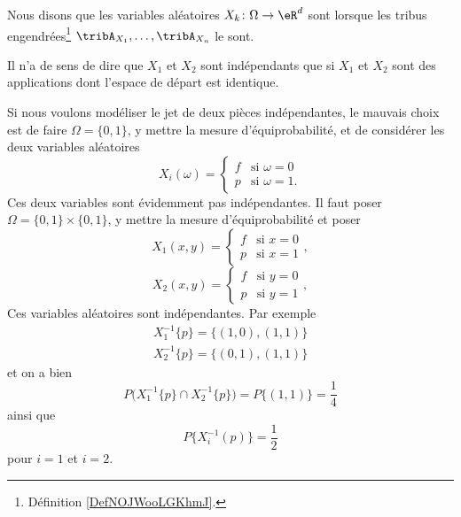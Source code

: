 \begin{definition}  \label{DefNJUkotc}
	Nous disons que les variables aléatoires \( X_k\colon \Omega\to \eR^d\) sont  lorsque les tribus engendrées\footnote{Définition \ref{DefNOJWooLGKhmJ}.} \( \tribA_{X_1},\ldots,\tribA_{X_n}\) le sont.
\end{definition}

\begin{remark}
	Il n'a de sens de dire que \( X_1\) et \( X_2\) sont indépendants que si \( X_1\) et \( X_2\) sont des applications dont l'espace de départ est identique.

	Si nous voulons modéliser le jet de deux pièces indépendantes, le mauvais choix est de faire \( \Omega=\{ 0,1 \}\), y mettre la mesure d'équiprobabilité, et de considérer les deux variables aléatoires
	\begin{equation}
		X_i(\omega)=\begin{cases}
			f & \text{si } \omega=0  \\
			p & \text{si } \omega=1.
		\end{cases}
	\end{equation}
	Ces deux variables sont évidemment pas indépendantes. Il faut poser \( \Omega=\{ 0,1 \}\times \{ 0,1 \}\), y mettre la mesure d'équiprobabilité et poser
	\begin{equation}
		X_1(x,y)=\begin{cases}
			f & \text{si } x=0 \\
			p & \text{si } x=1
		\end{cases},
	\end{equation}
	\begin{equation}
		X_2(x,y)=\begin{cases}
			f & \text{si } y=0 \\
			p & \text{si } y=1
		\end{cases},
	\end{equation}
	Ces variables aléatoires sont indépendantes. Par exemple
	\begin{subequations}
		\begin{align}
			X_1^{-1}\{ p \}=\{ (1,0),(1,1) \} \\
			X_2^{-1}\{ p \}=\{ (0,1),(1,1) \}
		\end{align}
	\end{subequations}
	et on a bien
	\begin{equation}
		P\big( X_1^{-1}\{ p \}\cap X_2^{-1}\{ p \} \big)=P\{ (1,1) \}=\frac{1}{ 4 }
	\end{equation}
	ainsi que
	\begin{equation}
		P\{ X_i^{-1}(p) \}=\frac{ 1 }{2}
	\end{equation}
	pour \( i=1\) et \( i=2\).
\end{remark}

